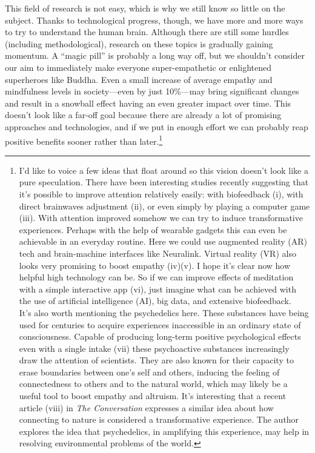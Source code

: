 \documentclass[12pt]{report}
\begin{document}
\noindent This field of research is not easy, which is why we still know so little on the subject. Thanks to technological progress, though, we have more and more ways to try to understand the human brain. Although there are still some hurdles (including methodological), research on these topics is gradually gaining momentum. A ``magic pill'' is probably a long way off, but we shouldn’t consider our aim to immediately make everyone super-empathetic or enlightened superheroes like Buddha. Even a small increase of average empathy and mindfulness levels in society\thinspace---\thinspace even by just 10\%\thinspace---\thinspace may bring significant changes and result in a snowball effect having an even greater impact over time. This doesn’t look like a far-off goal because there are already a lot of promising approaches and technologies, and if we put in enough effort we can probably reap positive benefits sooner rather than later.\footnote{I’d like to voice a few ideas that float around so this vision doesn’t look like a pure speculation. There have been interesting studies recently suggesting that it’s possible to improve attention relatively easily: with biofeedback (i), with direct brainwaves adjustment (ii), or even simply by playing a computer game (iii). With attention improved somehow we can try to induce transformative experiences. Perhaps with the help of wearable gadgets this can even be achievable in an everyday routine. Here we could use augmented reality (AR) tech and brain-machine interfaces like Neuralink. Virtual reality (VR) also looks very promising to boost empathy (iv)(v). I hope it’s clear now how helpful high technology can be. So if we can improve effects of meditation with a simple interactive app (vi), just imagine what can be achieved with the use of artificial intelligence (AI), big data, and extensive biofeedback.\\
\indent It’s also worth mentioning the psychedelics here. These substances have being used for centuries to acquire experiences inaccessible in an ordinary state of consciousness. Capable of producing long-term positive psychological effects even with a single intake (vii) these psychoactive substances increasingly draw the attention of scientists. They are also known for their capacity to erase boundaries between one’s self and others, inducing the feeling of connectedness to others and to the natural world, which may likely be a useful tool to boost empathy and altruism. It’s interesting that a recent article (viii) in \textit{The Conversation} expresses a similar idea about how connecting to nature is considered a transformative experience. The author explores the idea that psychedelics, in amplifying this experience, may help in resolving environmental problems of the world.
}
\end{document}
